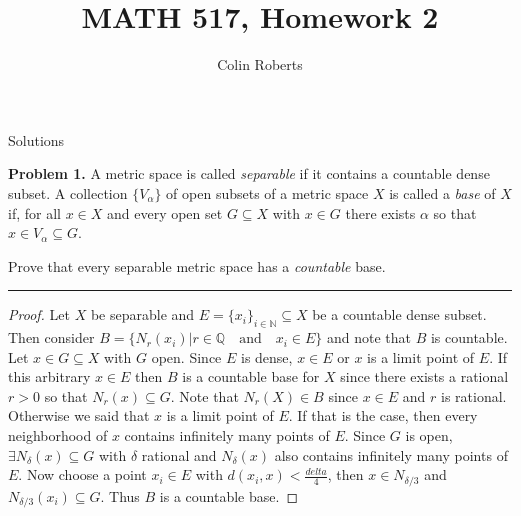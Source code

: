 \documentclass[leqno]{article}
\author{Colin Roberts}
\title{MATH 517, Homework 2}
\theoremstyle{nonumberplain}
\newtheorem{proof}{Proof}
\begin{document}
\maketitle
\begin{large}
\begin{center}
Solutions
\end{center}
\end{large}
\pagebreak


\noindent\textbf{Problem 1.} A metric space is called \emph{separable} if it contains a countable dense subset.  A collection $\{V_\alpha\}$ of open subsets of a metric space $X$ is called a \emph{base} of $X$ if, for all $x\in X$ and every open set $G\subseteq X$ with $x\in G$ there exists $\alpha$ so that $x\in V_\alpha\subseteq G$.

\noindent Prove that every separable metric space has a \emph{countable} base.  

\noindent\rule[0.5ex]{\linewidth}{1pt}

\begin{proof}
Let $X$ be separable and $E=\{x_i\}_{i\in \mathbb{N}}\subseteq X$ be a countable dense subset. Then consider $B=\{N_r(x_i) \vert r\in \mathbb{Q} \textrm{~~ and ~~} x_i\in E\}$ and note that $B$ is countable.  Let $x\in G \subseteq X$ with $G$ open.  Since $E$ is dense, $x\in E$ or $x$ is a limit point of $E$. If this arbitrary $x\in E$ then $B$ is a countable base for $X$ since there exists a rational $r>0$ so that $N_r(x)\subseteq G$.  Note that $N_r(X)\in B$ since $x\in E$ and $r$ is rational.  Otherwise we said that $x$ is a limit point of $E$.  If that is the case, then every neighborhood of $x$ contains infinitely many points of $E$. Since $G$ is open, $\exists N_\delta(x)\subseteq G$ with $\delta$ rational and $N_\delta(x)$ also contains infinitely many points of $E$. Now choose a point $x_i \in E$ with $d(x_i,x)<\frac{delta}{4}$, then $x\in N_{\delta/3}$ and $N_{\delta/3}(x_i)\subseteq G$. Thus $B$ is a countable base.
\end{proof}

\pagebreak

\end{document}
